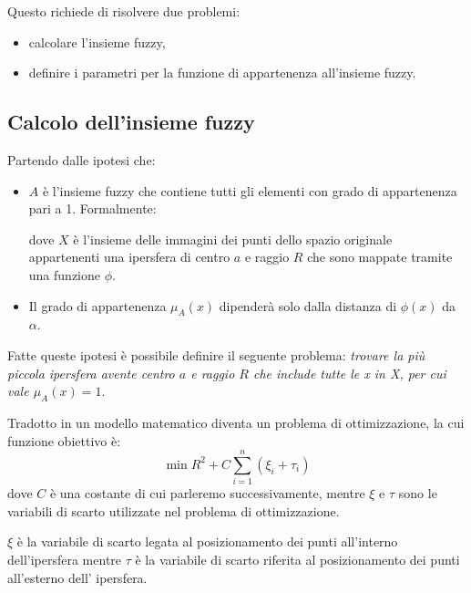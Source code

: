 \documentclass[12pt,italian]{report}
\begin{document}
\pagebreak
Questo richiede di risolvere due problemi:
\begin{itemize}
	\item calcolare l'insieme fuzzy,
	\item definire i parametri per la funzione di appartenenza all'insieme fuzzy.
\end{itemize}

\subsection {Calcolo dell'insieme fuzzy}
Partendo dalle ipotesi che:
\begin{itemize}
	\item $ A $ è l'insieme fuzzy che contiene tutti gli elementi con grado di appartenenza pari a 1. Formalmente:
	\begin{center}
	\end{center}
	dove $ X $ è l'insieme delle immagini dei punti dello spazio originale appartenenti una ipersfera di centro $a$ e raggio $ R $ che sono mappate tramite una funzione $\phi$.
	
	\item Il grado di appartenenza $ \mu_{A}(x) $ dipenderà solo dalla distanza di $ \phi(x) $ da $ \alpha $.
\end{itemize}

Fatte queste ipotesi è possibile definire il seguente problema:
\emph{trovare la più piccola ipersfera avente centro $a$ e raggio $R$ che include tutte le x in X, per cui vale $ \mu_{A}(x) = 1 $}.


Tradotto in un modello matematico diventa un problema di ottimizzazione, la cui funzione obiettivo è:
\[ \min R^2 + C\sum_{i=1}^{n} (\xi_{i} + \tau_{i}) \]
dove $ C $ è una costante di cui parleremo successivamente, mentre $ \xi $ e $ \tau $ sono le variabili di scarto utilizzate nel problema di ottimizzazione.

$ \xi $ è la variabile di scarto legata al posizionamento dei punti all'interno dell'ipersfera mentre $ \tau $ è la variabile di scarto riferita al posizionamento dei punti all'esterno dell' ipersfera.
\end{document}
